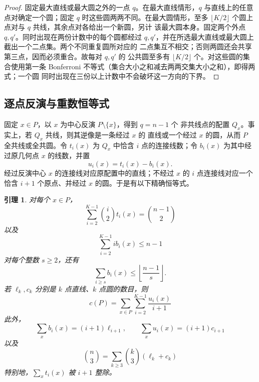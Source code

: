 \documentclass[11pt,a4paper]{ctexart}
\newtheorem{lemma}[theorem]{引理}
\theoremstyle{definition}
\begin{document}
\begin{proof}
固定最大直线或最大圆之外的一点 $q$。在最大直线情形，$q$ 与直线上的任意
点对确定一个圆；固定 $q$ 时这些圆两两不同。在最大圆情形，至多
$\lfloor K/2\rfloor$ 个圆上点对与 $q$ 共线，其余点对各给出一个新圆，另计
该最大圆本身。固定两个外点 $q,q'$。同时出现在两份计数中的每个圆都经过
$q,q'$，并在所选最大直线或最大圆上截出一个二点集。两个不同重复圆所对应的
二点集互不相交；否则两圆还会共享第三点，因而必须重合。故每对 $q,q'$ 的
公共圆至多有 $\lfloor K/2\rfloor$ 个。对这些圆的集合使用第一条
Bonferroni 不等式（集合大小之和减去两两交集大小之和），即得两式；一个圆
同时出现在三份以上计数中不会破坏这一方向的下界。
\end{proof}

\subsection{逐点反演与重数恒等式}

固定 $x\in P$，以 $x$ 为中心反演 $P\setminus\{x\}$，得到 $q=n-1$ 个
非共线点的配置 $Q_x$。事实上，若 $Q_x$ 共线，则其逆像是一条经过 $x$ 的
直线或一个经过 $x$ 的圆，从而 $P$ 全共线或全共圆。令 $t_i(x)$ 为
$Q_x$ 中恰含 $i$ 点的连接线数；令
$b_i(x)$ 为其中经过原几何点 $x$ 的线数，并置
\[
u_i(x)=t_i(x)-b_i(x).
\]
经过反演中心 $x$ 的连接线对应原配置中的直线；不经过 $x$ 的 $i$ 点连接线对应一个
恰含 $i+1$ 个原点、并经过 $x$ 的圆。于是有以下精确恒等式。

\begin{lemma}\label{lem:identities}
对每个 $x\in P$，
\begin{equation}\label{eq:pairs}
\sum_{i=2}^{K-1}\binom i2t_i(x)=\binom{n-1}{2}
\end{equation}
以及
\begin{equation}\label{eq:center-cap}
\sum_{i=2}^{K-1}i b_i(x)\le n-1
\end{equation}
对每个整数 $s\ge2$，还有
\begin{equation}\label{eq:rounded-centre}
\sum_{i\ge s}b_i(x)\le
\left\lfloor\frac{n-1}{s}\right\rfloor.
\end{equation}
若 $\ell_k,c_k$ 分别是 $k$ 点直线、$k$ 点圆的数目，则
\begin{equation}\label{eq:circleexact}
c(P)=\sum_{x\in P}\sum_{i=2}^{K-1}\frac{u_i(x)}{i+1}
\end{equation}
此外，
\begin{equation}\label{eq:incidence}
\sum_xb_i(x)=(i+1)\ell_{i+1},\qquad
\sum_xu_i(x)=(i+1)c_{i+1}
\end{equation}
以及
\begin{equation}\label{eq:triples}
\binom n3=\sum_{k\ge3}\binom k3(\ell_k+c_k)
\end{equation}
特别地，$\sum_xt_i(x)$ 被 $i+1$ 整除。
\end{lemma}
\end{document}
